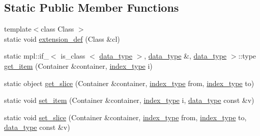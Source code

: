 \subsection*{\-Static \-Public \-Member \-Functions}
\begin{DoxyCompactItemize}
\item 
{\footnotesize template$<$class Class $>$ }\\static void \hyperlink{classboost_1_1python_1_1std__vector__indexing__suite_a5245748d2887fb696789dd5d3aa789ab}{extension\-\_\-def} (\-Class \&cl)
\item 
static mpl\-::if\-\_\-$<$ is\-\_\-class\*
$<$ \hyperlink{classboost_1_1python_1_1std__vector__indexing__suite_a9c3db9df25d6966c54154275377c94ce}{data\-\_\-type} $>$, \hyperlink{classboost_1_1python_1_1std__vector__indexing__suite_a9c3db9df25d6966c54154275377c94ce}{data\-\_\-type} \*
\&, \hyperlink{classboost_1_1python_1_1std__vector__indexing__suite_a9c3db9df25d6966c54154275377c94ce}{data\-\_\-type} $>$\-::type \hyperlink{classboost_1_1python_1_1std__vector__indexing__suite_a04e38bebceb369bd5f81f4a7558368bb}{get\-\_\-item} (\-Container \&container, \hyperlink{classboost_1_1python_1_1std__vector__indexing__suite_a3124827b535a08798fbd33b9fee7b668}{index\-\_\-type} i)
\item 
static object \hyperlink{classboost_1_1python_1_1std__vector__indexing__suite_a4123e6c0c99de706c07b215cb4828e91}{get\-\_\-slice} (\-Container \&container, \hyperlink{classboost_1_1python_1_1std__vector__indexing__suite_a3124827b535a08798fbd33b9fee7b668}{index\-\_\-type} from, \hyperlink{classboost_1_1python_1_1std__vector__indexing__suite_a3124827b535a08798fbd33b9fee7b668}{index\-\_\-type} to)
\item 
static void \hyperlink{classboost_1_1python_1_1std__vector__indexing__suite_a8093bf206598b549f350eb7ab4d59d8a}{set\-\_\-item} (\-Container \&container, \hyperlink{classboost_1_1python_1_1std__vector__indexing__suite_a3124827b535a08798fbd33b9fee7b668}{index\-\_\-type} i, \hyperlink{classboost_1_1python_1_1std__vector__indexing__suite_a9c3db9df25d6966c54154275377c94ce}{data\-\_\-type} const \&v)
\item 
static void \hyperlink{classboost_1_1python_1_1std__vector__indexing__suite_a5860806d99df81ed866c00d4af262ab2}{set\-\_\-slice} (\-Container \&container, \hyperlink{classboost_1_1python_1_1std__vector__indexing__suite_a3124827b535a08798fbd33b9fee7b668}{index\-\_\-type} from, \hyperlink{classboost_1_1python_1_1std__vector__indexing__suite_a3124827b535a08798fbd33b9fee7b668}{index\-\_\-type} to, \hyperlink{classboost_1_1python_1_1std__vector__indexing__suite_a9c3db9df25d6966c54154275377c94ce}{data\-\_\-type} const \&v)

\end{DoxyCompactItemize}
